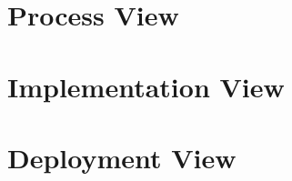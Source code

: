\documentclass{book}
\begin{document}
\chapter{Process View}

\chapter{Implementation View}

\chapter{Deployment View}
\end{document}
